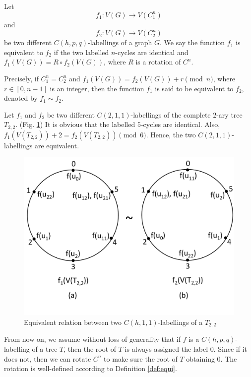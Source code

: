 \begin{definition}
\label{def:equi}
Let 
\[
f_1 : V(G) \rightarrow V(C_1^n)
\]
and
\[
f_2: V(G) \rightarrow V(C_2^n)
\]
be two different $C(h,p,q)$-labellings of a graph $G$. We say the function $f_{1}$ is equivalent to $f_{2}$ if the two labelled $n$-cycles are identical and $f_1(V(G)) = R \circ f_2(V(G))$, where $R$ is a rotation of $C^n$. 

Precisely, if $C_1^n = C_2^n$ and $f_1(V(G)) = f_2(V(G)) +r \pmod n$, where $r \in [0,n-1]$ is an integer, then the function $f_1$ is said to be equivalent to $f_2$, denoted by   $f_{1} \sim f_{2}$. 
\end{definition}

\begin{example} 
Let $f_1$ and $f_2$ be two different $C(2,1,1)$-labellings of the complete $2$-ary tree $T_{2,2}$. (Fig. \ref{fig equivalent}) It is obvious that the labelled $5$-cycles are identical. Also, $f_1(V(T_{2,2})) +2= f_2(V(T_{2,2})) \pmod 6$. Hence, the two $C(2,1,1)$-labellings are equivalent. 
\begin{figure}
  \centering
    \includegraphics[scale=0.4]{../figures/fig4-3.pdf} 
    \vspace{-10pt}
\caption{Equivalent relation between two $C(h,1,1)$-labellings of a $T_{2,2}$}
\label{fig equivalent}
\end{figure} 
\end{example}

\begin{remark}
\label{rmk:fix0}
From now on, we assume without loss of generality that if $f$ is a $C(h,p,q)$-labelling of a tree $T$, then the root of $T$ is always assigned the label $0$. Since if it does not, then we can rotate $C^n$ to make sure the root of $T$ obtaining $0$. The rotation is well-defined according to Definition \ref{def:equi}.
\end{remark}


